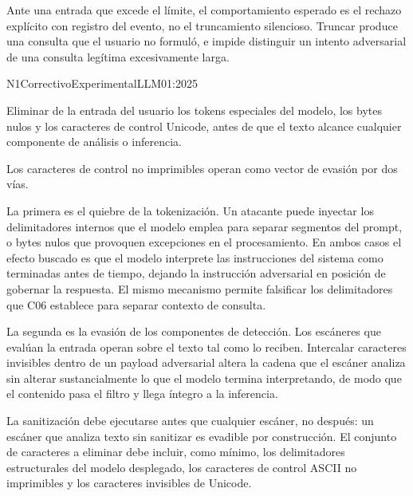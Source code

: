 Ante una entrada que excede el límite, el comportamiento esperado es el rechazo explícito con registro del evento, no el truncamiento silencioso. Truncar produce una consulta que el usuario no formuló, e impide distinguir un intento adversarial de una consulta legítima excesivamente larga.


  {N1}{Correctivo}{Experimental}{LLM01:2025}

Eliminar de la entrada del usuario los tokens especiales del modelo, los bytes nulos y los caracteres de control Unicode, antes de que el texto alcance cualquier componente de análisis o inferencia.

Los caracteres de control no imprimibles operan como vector de evasión por dos vías.

La primera es el quiebre de la tokenización. Un atacante puede inyectar los delimitadores internos que el modelo emplea para separar segmentos del prompt, o bytes nulos que provoquen excepciones en el procesamiento. En ambos casos el efecto buscado es que el modelo interprete las instrucciones del sistema como terminadas antes de tiempo, dejando la instrucción adversarial en posición de gobernar la respuesta. El mismo mecanismo permite falsificar los delimitadores que C06 establece para separar contexto de consulta.

La segunda es la evasión de los componentes de detección. Los escáneres que evalúan la entrada operan sobre el texto tal como lo reciben. Intercalar caracteres invisibles dentro de un payload adversarial altera la cadena que el escáner analiza sin alterar sustancialmente lo que el modelo termina interpretando, de modo que el contenido pasa el filtro y llega íntegro a la inferencia.

La sanitización debe ejecutarse antes que cualquier escáner, no después: un escáner que analiza texto sin sanitizar es evadible por construcción. El conjunto de caracteres a eliminar debe incluir, como mínimo, los delimitadores estructurales del modelo desplegado, los caracteres de control ASCII no imprimibles y los caracteres invisibles de Unicode.

